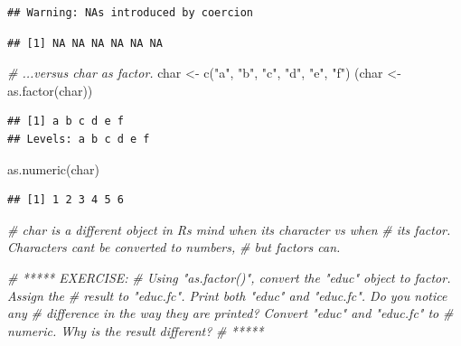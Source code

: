 \documentclass[
]{book}
\newenvironment{Shaded}{\begin{snugshade}}{\end{snugshade}}
\newcommand{\CommentTok}[1]{\textcolor[rgb]{0.56,0.35,0.01}{\textit{#1}}}
\newcommand{\FunctionTok}[1]{\textcolor[rgb]{0.00,0.00,0.00}{#1}}
\newcommand{\NormalTok}[1]{#1}
\newcommand{\OtherTok}[1]{\textcolor[rgb]{0.56,0.35,0.01}{#1}}
\newcommand{\StringTok}[1]{\textcolor[rgb]{0.31,0.60,0.02}{#1}}
\begin{document}
\begin{verbatim}
## Warning: NAs introduced by coercion
\end{verbatim}

\begin{verbatim}
## [1] NA NA NA NA NA NA
\end{verbatim}

\begin{Shaded}
\begin{Highlighting}[]
\CommentTok{\# ...versus char as factor.}
\NormalTok{char }\OtherTok{\textless{}{-}} \FunctionTok{c}\NormalTok{(}\StringTok{"a"}\NormalTok{, }\StringTok{"b"}\NormalTok{, }\StringTok{"c"}\NormalTok{, }\StringTok{"d"}\NormalTok{, }\StringTok{"e"}\NormalTok{, }\StringTok{"f"}\NormalTok{)}
\NormalTok{(char }\OtherTok{\textless{}{-}} \FunctionTok{as.factor}\NormalTok{(char))}
\end{Highlighting}
\end{Shaded}

\begin{verbatim}
## [1] a b c d e f
## Levels: a b c d e f
\end{verbatim}

\begin{Shaded}
\begin{Highlighting}[]
\FunctionTok{as.numeric}\NormalTok{(char)}
\end{Highlighting}
\end{Shaded}

\begin{verbatim}
## [1] 1 2 3 4 5 6
\end{verbatim}

\begin{Shaded}
\begin{Highlighting}[]
\CommentTok{\# char is a different object in R\textquotesingle{}s mind when it\textquotesingle{}s character vs when}
\CommentTok{\# it\textquotesingle{}s factor. Characters can\textquotesingle{}t be converted to numbers,}
\CommentTok{\# but factors can.}

\CommentTok{\# ***** EXERCISE: }
\CommentTok{\# Using "as.factor()", convert the "educ" object to factor. Assign the}
\CommentTok{\# result to "educ.fc". Print both "educ" and "educ.fc". Do you notice any}
\CommentTok{\# difference in the way they are printed? Convert "educ" and "educ.fc" to}
\CommentTok{\# numeric. Why is the result different?}
\CommentTok{\# *****}
\end{Highlighting}
\end{Shaded}
\end{document}
